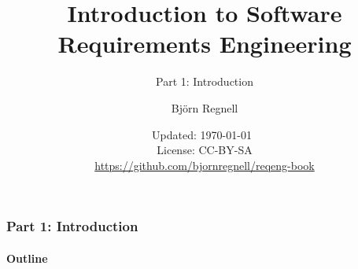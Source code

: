 \documentclass{reqenglecture}
\title{Introduction to Software Requirements Engineering}
\subtitle{Part 1: Introduction}
\author{Björn Regnell}
\date{\vspace{1em}\footnotesize Updated: \today~
\\ License: CC-BY-SA 
\\ \url{https://github.com/bjornregnell/reqeng-book} 
}
\begin{document}
\maketitle

\begin{frame}
\frametitle{Part 1: Introduction}
\framesubtitle{Outline}
\tableofcontents
\end{frame}



















\end{document}
